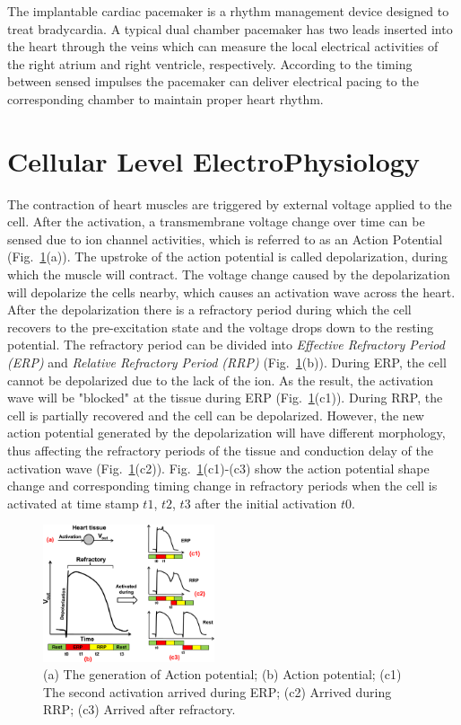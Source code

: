 \documentclass[openany]{now} %
\newcommand{\figref}[1]{Fig.~\ref{fig:#1}}
\begin{document}
The implantable cardiac pacemaker is a rhythm management device designed to treat bradycardia. A typical dual chamber pacemaker has two leads inserted into the heart through the veins which can measure the local electrical activities of the right atrium and right ventricle, respectively. According to the timing between sensed impulses the pacemaker can deliver electrical pacing to the corresponding chamber to maintain proper heart rhythm.

\section{Cellular Level ElectroPhysiology}
The contraction of heart muscles are triggered by external voltage applied to the cell. After the activation, a transmembrane voltage change over time can be sensed due to ion channel activities, which is referred to as an Action Potential (\figref{refractory}(a)). The upstroke of the action potential is called depolarization, during which the muscle will contract. The voltage change caused by the depolarization will depolarize the cells nearby, which causes an activation wave across the heart. After the depolarization there is a refractory period during which the cell recovers to the pre-excitation state and the voltage drops down to the resting potential. The refractory period can be divided into \emph{Effective Refractory Period (ERP)} and \emph{Relative Refractory Period (RRP)} (\figref{refractory}(b)). During ERP, the cell cannot be depolarized due to the lack of the ion. As the result, the activation wave will be "blocked" at the tissue during ERP (\figref{refractory}(c1)). During RRP, the cell is partially recovered and the cell can be depolarized. However, the new action potential generated by the depolarization will have different morphology, thus affecting the refractory periods of the tissue and conduction delay of the activation wave (\figref{refractory}(c2)). \figref{refractory}(c1)-(c3) show the action potential shape change and corresponding timing change in refractory periods when the cell is activated at time stamp $t1$, $t2$, $t3$ after the initial activation $t0$. 

\begin{figure}[!t]
\center
\includegraphics[width=0.45\textwidth]{figs/refractory.png}
\caption{(a) The generation of Action potential; (b) Action potential; (c1) The second activation arrived during ERP; (c2) Arrived during RRP; (c3) Arrived after refractory.}
\label{fig:refractory}
\end{figure} 
\end{document}
